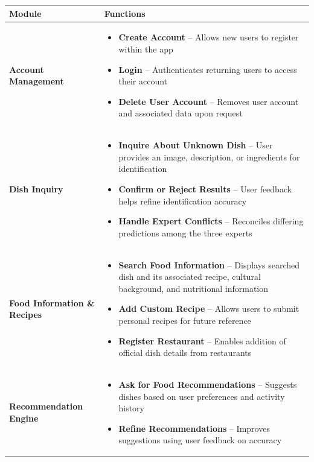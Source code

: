 \documentclass[]{article}
\begin{document}
\begin{table}[H]
	\centering
	\renewcommand{\arraystretch}{1.2} %
	\begin{tabular}{|p{4cm}|p{10cm}|}
	\hline
	\textbf{Module} & \textbf{Functions} \\
	\hline
	\textbf{Account Management} &
	\begin{itemize}
		\item \textbf{Create Account} – Allows new users to register within the app
		\item \textbf{Login} – Authenticates returning users to access their account
		\item \textbf{Delete User Account} – Removes user account and associated data upon request
	\end{itemize} \\
	\hline
	\textbf{Dish Inquiry} &
	\begin{itemize}
		\item \textbf{Inquire About Unknown Dish} – User provides an image, description, or ingredients for identification
		\item \textbf{Confirm or Reject Results} – User feedback helps refine identification accuracy 
		\item \textbf{Handle Expert Conflicts} – Reconciles differing predictions among the three experts
	\end{itemize} \\
	\hline
	\textbf{Food Information \& Recipes} &
	\begin{itemize}
		\item \textbf{Search Food Information} – Displays searched dish and its associated recipe, cultural background, and nutritional information
		\item \textbf{Add Custom Recipe} – Allows users to submit personal
	recipes for future reference
		\item \textbf{Register Restaurant} – Enables addition of official dish details from restaurants
	\end{itemize} \\
	\hline
	\textbf{Recommendation Engine} &
	\begin{itemize}
		\item \textbf{Ask for Food Recommendations} – Suggests dishes based on user preferences and activity history
		\item \textbf{Refine Recommendations} – Improves suggestions using user feedback on accuracy
	\end{itemize} \\

\end{tabular}
\end{table}
\end{document}
